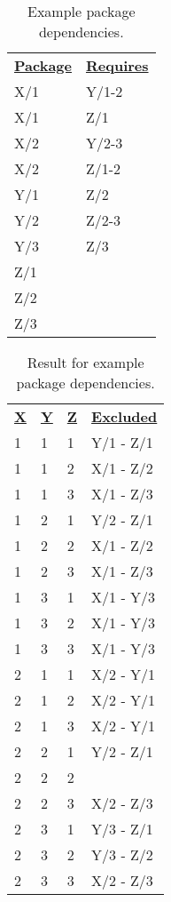 \documentclass[krantzl]{krantz}
\begin{document}
\begin{table}
\begin{tabular}{ll}
\textbf{\underline{Package}} & \textbf{\underline{Requires}} \\
X/1 & Y/1-2 \\
X/1 & Z/1 \\
X/2 & Y/2-3 \\
X/2 & Z/1-2 \\
Y/1 & Z/2 \\
Y/2 & Z/2-3 \\
Y/3 & Z/3 \\
Z/1 &  \\
Z/2 &  \\
Z/3 &  \\
\end{tabular}
\caption{Example package dependencies.}
\label{package-manager-example-dependencies}
\end{table}


\begin{table}
\begin{tabular}{llll}
\textbf{\underline{X}} & \textbf{\underline{Y}} & \textbf{\underline{Z}} & \textbf{\underline{Excluded}} \\
1 & 1 & 1 & Y/1 - Z/1 \\
1 & 1 & 2 & X/1 - Z/2 \\
1 & 1 & 3 & X/1 - Z/3 \\
1 & 2 & 1 & Y/2 - Z/1 \\
1 & 2 & 2 & X/1 - Z/2 \\
1 & 2 & 3 & X/1 - Z/3 \\
1 & 3 & 1 & X/1 - Y/3 \\
1 & 3 & 2 & X/1 - Y/3 \\
1 & 3 & 3 & X/1 - Y/3 \\
2 & 1 & 1 & X/2 - Y/1 \\
2 & 1 & 2 & X/2 - Y/1 \\
2 & 1 & 3 & X/2 - Y/1 \\
2 & 2 & 1 & Y/2 - Z/1 \\
2 & 2 & 2 &  \\
2 & 2 & 3 & X/2 - Z/3 \\
2 & 3 & 1 & Y/3 - Z/1 \\
2 & 3 & 2 & Y/3 - Z/2 \\
2 & 3 & 3 & X/2 - Z/3 \\
\end{tabular}
\caption{Result for example package dependencies.}
\label{package-manager-example-result}
\end{table}
\end{document}
